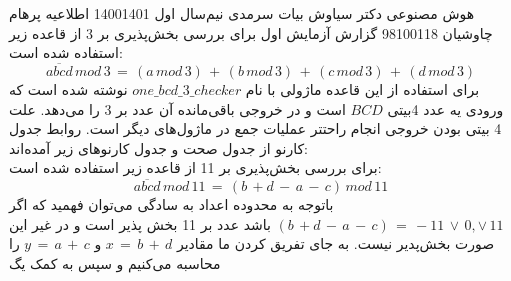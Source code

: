 \documentclass[a4paper,12pt]{article}
\begin{document}
\handout
{هوش مصنوعی}
{دکتر سیاوش بیات سرمدی}
{نیم‌سال اول 1400\lr{-}1401}
{اطلاعیه}
{پرهام چاوشیان}
{98100118}
 {گزارش آزمایش اول}
برای بررسی بخش‌پذیری بر 3 از قاعده زیر استفاده شده است:
\begin{equation*}
\overline{abcd}\,mod\,3\,=\,(a\,mod\,3)\,+\,(b\,mod\,3)\,+\,(c\,mod\,3)\,+\,(d\,mod\,3)
\end{equation*}
برای استفاده از این قاعده ماژولی با نام
$one\_bcd\_3\_checker$
نوشته شده است که ورودی یه عدد 4بیتی $BCD$ است و در خروجی باقی‌مانده آن عدد بر 3 را می‌دهد. علت 4 بیتی بودن خروجی انجام راحتتر عملیات جمع در ماژول‌های دیگر است. روابط جدول کارنو از جدول صحت و جدول کارنوهای زیر آمده‌اند:\\

برای بررسی بخش‌پذیری بر 11 از قاعده زیر استفاده شده است:
\begin{equation*}
\overline{abcd}\,mod\,11\,=\, (b\,+d\,-\,a\,-\,c)\, mod\,11
\end{equation*}
باتوجه به محدوده اعداد به سادگی می‌توان فهمید که اگر
$(b\,+d\,-\,a\,-\,c)\,=\,-11\,\vee \,0,\vee \,11$
باشد عدد بر 11 بخش پذیر است و در غیر این صورت بخش‌پدیر نیست. به جای تفریق کردن ما مقادیر
$x\,=\,b\,+\,d$
و
$y\,=\,a\,+\,c$
را محاسبه می‌کنیم و سپس به کمک یگ 
\end{document}
